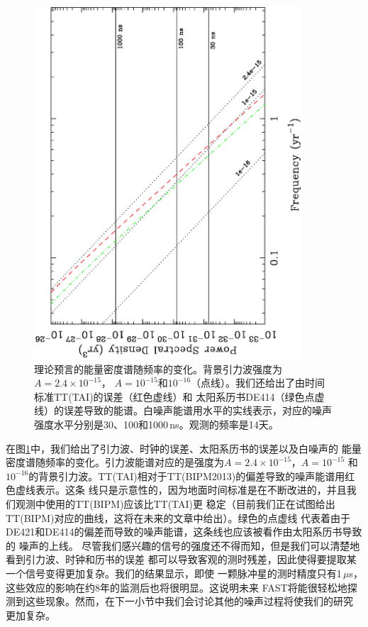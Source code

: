 \begin{figure}
\begin{center}
\includegraphics[angle=-90,width=10cm]{spectra1.ps}
\caption{理论预言的能量密度谱随频率的变化。背景引力波强度为$A = 2.4 \times 10^{-15}$，
$A = 10^{-15}$和$10^{-16}$（点线）。我们还给出了由时间标准TT(TAI)的误差（红色虚线）和
太阳系历书DE414（绿色点虚线）的误差导致的能谱。白噪声能谱用水平的实线表示，对应的噪声
强度水平分别是30、100和1000\,ns。观测的频率是14天。} 
\label{fg:spectra1}
\end{center}
\end{figure}

在图\ref{fg:spectra1}中，我们给出了引力波、时钟的误差、太阳系历书的误差以及白噪声的
能量密度谱随频率的变化。引力波能谱对应的是强度为$A = 2.4 \times 10^{-15}$，$A = 10^{-15}$
和$10^{-16}$的背景引力波。TT(TAI)相对于TT(BIPM2013)的偏差导致的噪声能谱用红色虚线表示。这条
线只是示意性的，因为地面时间标准是在不断改进的，并且我们观测中使用的TT(BIPM)应该比TT(TAI)更
稳定（目前我们正在试图给出TT(BIPM)对应的曲线，这将在未来的文章中给出）。绿色的点虚线
代表着由于DE421和DE414的偏差而导致的噪声能谱，这条线也应该被看作由太阳系历书导致的
噪声的上线。
尽管我们感兴趣的信号的强度还不得而知，但是我们可以清楚地看到引力波、时钟和历书的误差
都可以导致客观的测时残差，因此使得要提取某一个信号变得更加复杂。我们的结果显示，即使
一颗脉冲星的测时精度只有1\,$\mu$s，这些效应的影响在约8年的监测后也将很明显。这说明未来
FAST将能很轻松地探测到这些现象。然而，在下一小节中我们会讨论其他的噪声过程将使我们的研究
更加复杂。

